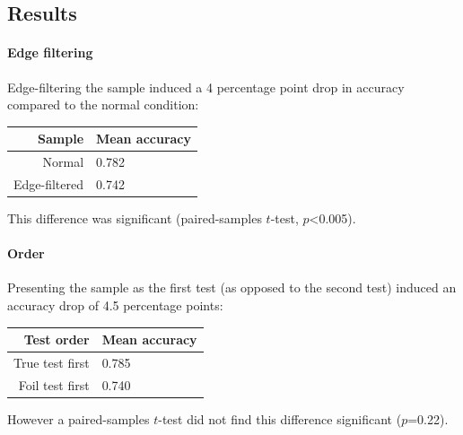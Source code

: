 \subsection{Results}

\paragraph{Edge filtering}

Edge-filtering the sample induced a 4 percentage point drop in accuracy compared to the normal condition:

\begin{center}
\begin{tabular}{ r | l   }
\textbf{Sample} & \textbf{Mean accuracy}\\
\hline
Normal &  0.782\\
Edge-filtered&  0.742\\
\end{tabular}
\end{center}


This difference was significant (paired-samples $t$-test, $p$<0.005).

\paragraph{Order}

Presenting the sample as the first test (as opposed to the second test) induced an accuracy drop of 4.5 percentage points:

\begin{center}
\begin{tabular}{ r | l   }
\textbf{Test order} & \textbf{Mean accuracy}\\
\hline
True test first &  0.785\\
Foil test first&  0.740\\
\end{tabular}
\end{center}

However a paired-samples $t$-test did not find this difference significant ($p$=0.22).




